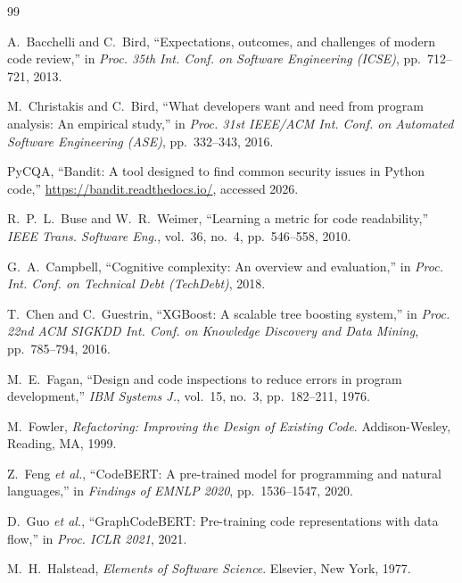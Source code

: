 \documentclass[12pt, oneside]{report}
\begin{document}

\begin{singlespace}
\begin{thebibliography}{99}

A.~Bacchelli and C.~Bird,
``Expectations, outcomes, and challenges of modern code review,''
in \textit{Proc. 35th Int. Conf. on Software Engineering (ICSE)},
pp.~712--721, 2013.

M.~Christakis and C.~Bird,
``What developers want and need from program analysis: An empirical study,''
in \textit{Proc. 31st IEEE/ACM Int. Conf. on Automated Software Engineering (ASE)},
pp.~332--343, 2016.

PyCQA,
``Bandit: A tool designed to find common security issues in Python code,''
\url{https://bandit.readthedocs.io/}, accessed 2026.

R.~P.~L.~Buse and W.~R.~Weimer,
``Learning a metric for code readability,''
\textit{IEEE Trans. Software Eng.}, vol.~36, no.~4, pp.~546--558, 2010.

G.~A.~Campbell,
``Cognitive complexity: An overview and evaluation,''
in \textit{Proc. Int. Conf. on Technical Debt (TechDebt)}, 2018.

T.~Chen and C.~Guestrin,
``XGBoost: A scalable tree boosting system,''
in \textit{Proc. 22nd ACM SIGKDD Int. Conf. on Knowledge Discovery and Data Mining},
pp.~785--794, 2016.

M.~E.~Fagan,
``Design and code inspections to reduce errors in program development,''
\textit{IBM Systems J.}, vol.~15, no.~3, pp.~182--211, 1976.

M.~Fowler,
\textit{Refactoring: Improving the Design of Existing Code}.
Addison-Wesley, Reading, MA, 1999.

Z.~Feng \textit{et al.},
``CodeBERT: A pre-trained model for programming and natural languages,''
in \textit{Findings of EMNLP 2020}, pp.~1536--1547, 2020.

D.~Guo \textit{et al.},
``GraphCodeBERT: Pre-training code representations with data flow,''
in \textit{Proc. ICLR 2021}, 2021.

M.~H.~Halstead,
\textit{Elements of Software Science}.
Elsevier, New York, 1977.


\end{thebibliography}
\end{singlespace}
\end{document}
